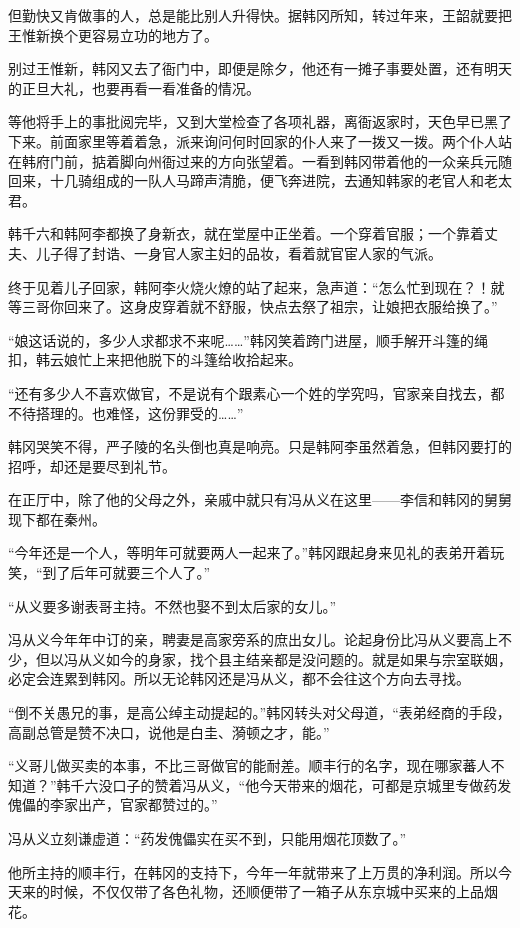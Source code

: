 但勤快又肯做事的人，总是能比别人升得快。据韩冈所知，转过年来，王韶就要把王惟新换个更容易立功的地方了。

别过王惟新，韩冈又去了衙门中，即便是除夕，他还有一摊子事要处置，还有明天的正旦大礼，也要再看一看准备的情况。

等他将手上的事批阅完毕，又到大堂检查了各项礼器，离衙返家时，天色早已黑了下来。前面家里等着着急，派来询问何时回家的仆人来了一拨又一拨。两个仆人站在韩府门前，掂着脚向州衙过来的方向张望着。一看到韩冈带着他的一众亲兵元随回来，十几骑组成的一队人马蹄声清脆，便飞奔进院，去通知韩家的老官人和老太君。

韩千六和韩阿李都换了身新衣，就在堂屋中正坐着。一个穿着官服；一个靠着丈夫、儿子得了封诰、一身官人家主妇的品妆，看着就官宦人家的气派。

终于见着儿子回家，韩阿李火烧火燎的站了起来，急声道：“怎么忙到现在？！就等三哥你回来了。这身皮穿着就不舒服，快点去祭了祖宗，让娘把衣服给换了。”

“娘这话说的，多少人求都求不来呢……”韩冈笑着跨门进屋，顺手解开斗篷的绳扣，韩云娘忙上来把他脱下的斗篷给收拾起来。

“还有多少人不喜欢做官，不是说有个跟素心一个姓的学究吗，官家亲自找去，都不待搭理的。也难怪，这份罪受的……”

韩冈哭笑不得，严子陵的名头倒也真是响亮。只是韩阿李虽然着急，但韩冈要打的招呼，却还是要尽到礼节。

在正厅中，除了他的父母之外，亲戚中就只有冯从义在这里——李信和韩冈的舅舅现下都在秦州。

“今年还是一个人，等明年可就要两人一起来了。”韩冈跟起身来见礼的表弟开着玩笑，“到了后年可就要三个人了。”

“从义要多谢表哥主持。不然也娶不到太后家的女儿。”

冯从义今年年中订的亲，聘妻是高家旁系的庶出女儿。论起身份比冯从义要高上不少，但以冯从义如今的身家，找个县主结亲都是没问题的。就是如果与宗室联姻，必定会连累到韩冈。所以无论韩冈还是冯从义，都不会往这个方向去寻找。

“倒不关愚兄的事，是高公绰主动提起的。”韩冈转头对父母道，“表弟经商的手段，高副总管是赞不决口，说他是白圭、漪顿之才，能。”

“义哥儿做买卖的本事，不比三哥做官的能耐差。顺丰行的名字，现在哪家蕃人不知道？”韩千六没口子的赞着冯从义，“他今天带来的烟花，可都是京城里专做药发傀儡的李家出产，官家都赞过的。”

冯从义立刻谦虚道：“药发傀儡实在买不到，只能用烟花顶数了。”

他所主持的顺丰行，在韩冈的支持下，今年一年就带来了上万贯的净利润。所以今天来的时候，不仅仅带了各色礼物，还顺便带了一箱子从东京城中买来的上品烟花。

